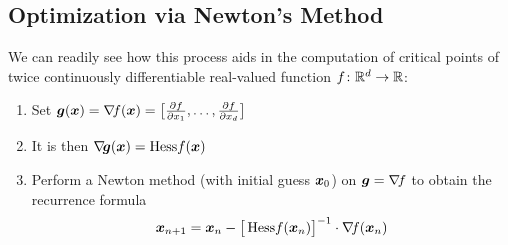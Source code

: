 \subsection{Optimization via Newton's Method}
We can readily see how this process aids in the computation of critical points of twice continuously differentiable real-valued function $f\colon \mathbb{R}^d \to \mathbb{R}$:
\begin{enumerate}
	\item Set $\boldsymbol{g}(\boldsymbol{x}) = \mathop{\nabla\! {f}}(\boldsymbol{x}) = \big[ \frac{\partial f}{\partial x_1}, \dotsc, \frac{\partial f}{\partial x_d} \big]$
	\item It is then $\mathop{\nabla\! {\boldsymbol{g}}}(\boldsymbol{x}) = \mathop{\mathrm{Hess}{f}}(\boldsymbol{x})$
	\item Perform a Newton method (with initial guess $\boldsymbol{x}_0$) on $\boldsymbol{g}=\mathop{\nabla\! {f}}$ to obtain the recurrence formula
	\begin{equation}\label{equation:Newton4Crit}
	\boldsymbol{x}_{n+1} = \boldsymbol{x}_n - \big[ \mathop{\mathrm{Hess}{f}}(\boldsymbol{x}_n) \big]^{-1} \cdot \mathop{\nabla\! {f}}(\boldsymbol{x}_n)
	\end{equation}
\end{enumerate}

